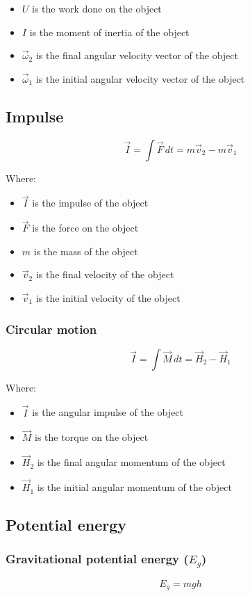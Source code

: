 \documentclass[11pt]{article}
\begin{document}
\begin{itemize}
\item \(U\) is the work done on the object
\item \(I\) is the moment of inertia of the object
\item \(\vec{\omega}_2\) is the final angular velocity vector of the object
\item \(\vec{\omega}_1\) is the initial angular velocity vector of the object
\end{itemize}

\subsection{Impulse}
\label{sec:org845f0cc}
\[\vec{I} = \int \vec{F} \, dt = m \vec{v}_2 - m \vec{v}_1\]

Where:
\begin{itemize}
\item \(\vec{I}\) is the impulse of the object
\item \(\vec{F}\) is the force on the object
\item \(m\) is the mass of the object
\item \(\vec{v}_2\) is the final velocity of the object
\item \(\vec{v}_1\) is the initial velocity of the object
\end{itemize}

\subsubsection{Circular motion}
\label{sec:org9c9649c}
\[\vec{I} = \int \vec{M} \, dt = \vec{H}_2 - \vec{H}_1\]

Where:
\begin{itemize}
\item \(\vec{I}\) is the angular impulse of the object
\item \(\vec{M}\) is the torque on the object
\item \(\vec{H}_2\) is the final angular momentum of the object
\item \(\vec{H}_1\) is the initial angular momentum of the object
\end{itemize}

\subsection{Potential energy}
\label{sec:org3ca4655}

\subsubsection{Gravitational potential energy (\(E_g\))}
\label{sec:orgc87603a}
\[E_g = mgh\]
\end{document}
